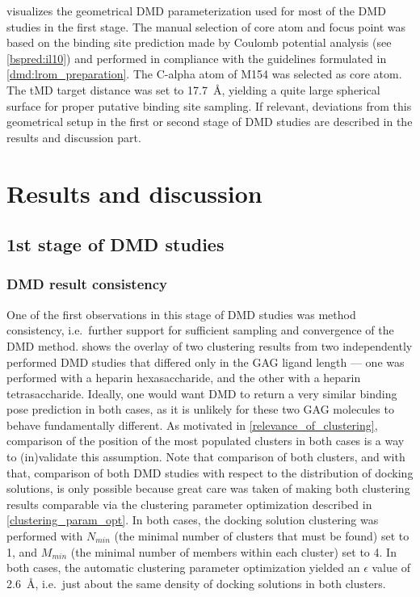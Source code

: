  visualizes the geometrical DMD
parameterization used for most of the DMD studies in the first stage. The manual
selection of core atom and focus point was based on the binding site prediction
made by Coulomb potential analysis (see \cref{bspred:il10}) and performed in
compliance with the guidelines formulated in \cref{dmd:lrom_preparation}. The
C-alpha atom of M154 was selected as core atom. The tMD target distance was set
to \SI{17.7}{\angstrom}, yielding a quite large spherical surface for proper
putative binding site sampling. If relevant, deviations from this geometrical
setup in the first or second stage of DMD studies are described in the results
and discussion part.


\section{Results and discussion}

\subsection{1st stage of DMD studies}

\subsubsection{DMD result consistency}

One of the first observations in this stage of DMD studies was method
consistency, i.e.\ further support for sufficient sampling and convergence of
the DMD method. 
shows the overlay of two clustering results from two independently performed DMD
studies that differed only in the GAG ligand length --- one was performed with a
heparin hexasaccharide, and the other with a heparin tetrasaccharide. Ideally,
one would want DMD to return a very similar binding pose prediction in both
cases, as it is unlikely for these two GAG molecules to behave fundamentally
different. As motivated in \cref{relevance_of_clustering}, comparison of the
position of the most populated clusters in both cases is a way to (in)validate
this assumption. Note that comparison of both clusters, and with that,
comparison of both DMD studies with respect to the distribution of docking
solutions, is only possible because great care was taken of making both
clustering results comparable via the clustering parameter optimization
described in \cref{clustering_param_opt}. In both cases, the docking solution
clustering was performed with $N_{min}$ (the minimal number of clusters that
must be found) set to 1, and $M_{min}$ (the minimal number of members within
each cluster) set to 4. In both cases, the automatic clustering parameter
optimization yielded an $\epsilon$ value of \SI{2.6}{\angstrom}, i.e.\ just
about the same density of docking solutions in both clusters.

